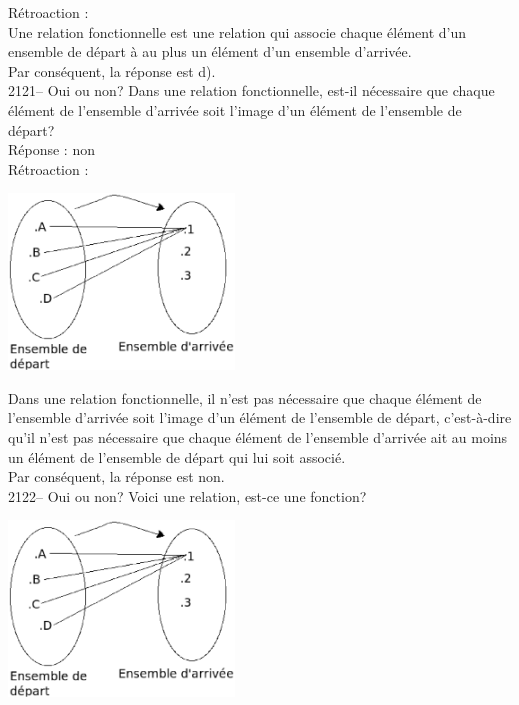 \documentclass[letterpaper, 12pt]{article}
\begin{document}
R\'etroaction :\\
Une relation fonctionnelle est une relation qui associe chaque \'el\'ement d'un ensemble de d\'epart \`a au plus un \'el\'ement d'un ensemble d'arriv\'ee. \\
Par cons\'equent, la r\'eponse est d).\\

2121-- Oui ou non? Dans une relation fonctionnelle, est-il n\'ecessaire que chaque \'el\'ement de l'ensemble d'arriv\'ee soit l'image d'un \'el\'ement de l'ensemble de d\'epart? \\

R\'eponse : non \\

R\'etroaction :\\
\begin{center}
 \includegraphics[width=6cm,bb=0 542 400 842]{Q2121.eps}
\end{center}

Dans une relation fonctionnelle, il n'est pas n\'ecessaire que chaque \'el\'ement de l'ensemble d'arriv\'ee soit l'image d'un \'el\'ement de l'ensemble de d\'epart, c'est-\`a-dire qu'il n'est pas n\'ecessaire que chaque \'el\'ement de l'ensemble d'arriv\'ee ait au moins un \'el\'ement de l'ensemble de d\'epart qui lui soit associ\'e.\\
Par cons\'equent, la r\'eponse est non.\\

2122-- Oui ou non? Voici une relation, est-ce une fonction?\\

\begin{center}
 \includegraphics[width=6cm,bb=0 542 400 842]{Q2121.eps}
\end{center}
\end{document}
